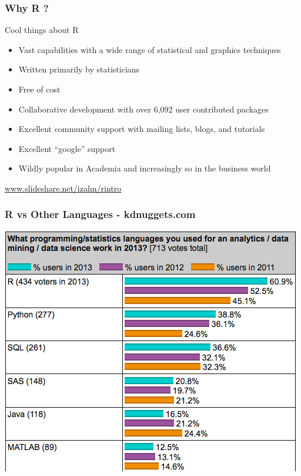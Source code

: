 \documentclass{beamer}
\begin{document}

\begin{frame}[fragile]
\frametitle{Why R ? }
\small
\begin{block}{Cool things about R}
\begin{itemize}
\item Vast capabilities with a wide range of statistical and graphics techniques
\item Written primarily by statisticians 
\item Free of cost 
\item Collaborative development with over 6,092 user contributed packages
\item Excellent community support with mailing lists, blogs, and tutorials
\item Excellent ``google'' support
\item Wildly popular in Academia and increasingly so in the business world
\end{itemize}
\end{block}
\begin{center}
\url{www.slideshare.net/izahn/rintro}
\end{center}
\end{frame}


\begin{frame}[fragile]
\frametitle{R vs Other Languages - kdnuggets.com}
\begin{center}
\includegraphics{../IMG/rvsothers.png}
\end{center}
\end{frame}
\end{document}
